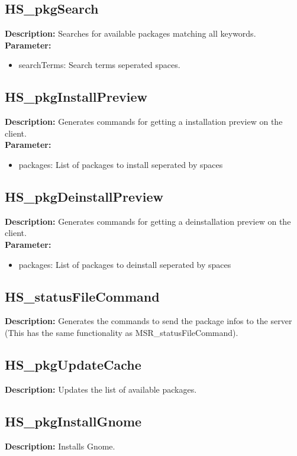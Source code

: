 \subsection{HS\_pkgSearch}
\textbf{Description:}  Searches for available packages matching all keywords.\\
\textbf{Parameter:}
\begin{itemize}
\item searchTerms: Search terms seperated spaces.
\end{itemize}

\subsection{HS\_pkgInstallPreview}
\textbf{Description:} Generates commands for getting a installation preview on the client.\\
\textbf{Parameter:}
\begin{itemize}
\item packages: List of packages to install seperated by spaces
\end{itemize}

\subsection{HS\_pkgDeinstallPreview}
\textbf{Description:} Generates commands for getting a deinstallation preview on the client.\\
\textbf{Parameter:}
\begin{itemize}
\item packages: List of packages to deinstall seperated by spaces
\end{itemize}

\subsection{HS\_statusFileCommand}
\textbf{Description:} Generates the commands to send the package infos to the server (This has the same functionality as MSR\_statusFileCommand).\\

\subsection{HS\_pkgUpdateCache}
\textbf{Description:} Updates the list of available packages.\\

\subsection{HS\_pkgInstallGnome}
\textbf{Description:} Installs Gnome.\\

